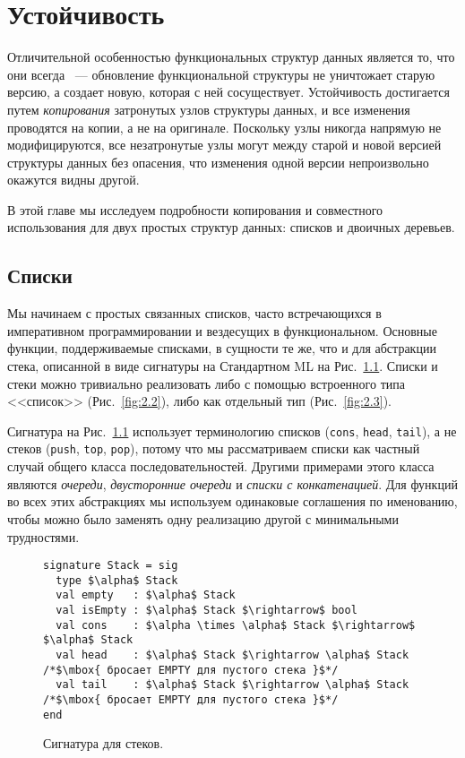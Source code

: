 \chapter{Устойчивость}
\label{ch:2}

Отличительной особенностью функциональных структур данных является то,
что они всегда ~--- обновление
функциональной структуры не уничтожает старую версию, а создает
новую, которая с ней сосуществует. Устойчивость достигается путем
\emph{копирования} затронутых узлов структуры данных, и все изменения
проводятся на копии, а не на оригинале. Поскольку узлы никогда
напрямую не модифицируются, все незатронутые узлы могут
 между старой и новой версией структуры
данных без опасения, что изменения одной версии непроизвольно окажутся
видны другой.

В этой главе мы исследуем подробности копирования и совместного использования для
двух простых структур данных: списков и двоичных деревьев.

\section{Списки}
\label{sc:2.1}

Мы начинаем с простых связанных списков, часто встречающихся в
императивном программировании и вездесущих в функциональном.  Основные
функции, поддерживаемые списками, в сущности те же, что и для
абстракции стека, описанной в виде сигнатуры на Стандартном ML на
Рис.~\ref{fig:2.1}.  Списки и стеки можно тривиально реализовать либо
с помощью встроенного типа <<список>> (Рис.~\ref{fig:2.2}), либо как
отдельный тип (Рис.~\ref{fig:2.3}).

\begin{remark}
Сигнатура на Рис.~\ref{fig:2.1} использует терминологию списков
(\texttt{cons}, \texttt{head}, \texttt{tail}), а не стеков
(\texttt{push}, \texttt{top}, \texttt{pop}), потому что мы
рассматриваем списки как частный случай общего класса
последовательностей. Другими примерами этого класса являются
\emph{очереди}, \emph{двусторонние очереди} и \emph{списки с
  конкатенацией}. Для функций во всех этих абстракциях мы используем
одинаковые соглашения по именованию, чтобы можно было заменять одну
реализацию другой с минимальными трудностями.
\end{remark}

\begin{figure}
\begin{lstlisting}
signature Stack = sig
  type $\alpha$ Stack
  val empty   : $\alpha$ Stack
  val isEmpty : $\alpha$ Stack $\rightarrow$ bool
  val cons    : $\alpha \times \alpha$ Stack $\rightarrow$ $\alpha$ Stack
  val head    : $\alpha$ Stack $\rightarrow \alpha$ Stack /*$\mbox{ бросает EMPTY для пустого стека }$*/
  val tail    : $\alpha$ Stack $\rightarrow \alpha$ Stack /*$\mbox{ бросает EMPTY для пустого стека }$*/
end
\end{lstlisting}

\caption{Сигнатура для стеков.}  \label{fig:2.1}
\end{figure}


